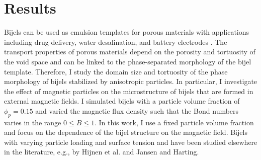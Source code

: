 
\section{Results}\label{sec:results_p1}

Bijels can be used as emulsion templates for porous materials with
applications including drug delivery, water desalination, and battery
electrodes
\cite{vanoli_bijels_2022, chen_pore-scale_2022, lu_controllable_2020, garcia_scalable_2019}.
The transport properties of porous materials depend on the porosity and
tortuosity of the void space and can be linked to the phase-separated
morphology of the bijel template. Therefore, I study the domain size
and tortuosity of the phase morphology of bijels stabilized by
anisotropic particles. In particular, I investigate the effect of
magnetic particles on the microstructure of bijels that are formed in
external magnetic fields. I simulated bijels with a particle volume
fraction of \(\phi_p=0.15\) and varied the magnetic flux density such
that the Bond numbers varies in the range \(0\le\bar{B}\le1\).
In this work, I use a fixed particle volume fraction and focus on the dependence of the 
bijel structure on the magnetic field. Bijels with varying particle loading and surface tension 
and have been studied elsewhere in the literature, e.g., by Hijnen et al.\cite{hijnen_bijels_2015} 
and Jansen and Harting\cite{jansen_bijels_2011}.

